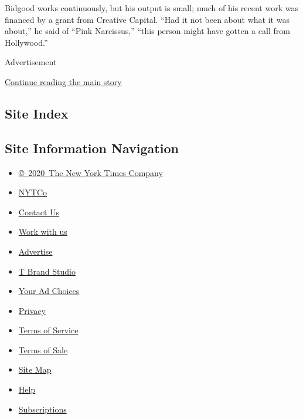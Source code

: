 Bidgood works continuously, but his output is small; much of his recent
work was financed by a grant from Creative Capital. ``Had it not been
about what it was about,'' he said of ``Pink Narcissus,'' ``this person
might have gotten a call from Hollywood.''

Advertisement

\protect\hyperlink{after-bottom}{Continue reading the main story}

\hypertarget{site-index}{%
\subsection{Site Index}\label{site-index}}

\hypertarget{site-information-navigation}{%
\subsection{Site Information
Navigation}\label{site-information-navigation}}

\begin{itemize}
\tightlist
\item
  \href{https://help.nytimes3xbfgragh.onion/hc/en-us/articles/115014792127-Copyright-notice}{©~2020~The
  New York Times Company}
\end{itemize}

\begin{itemize}
\tightlist
\item
  \href{https://www.nytco.com/}{NYTCo}
\item
  \href{https://help.nytimes3xbfgragh.onion/hc/en-us/articles/115015385887-Contact-Us}{Contact
  Us}
\item
  \href{https://www.nytco.com/careers/}{Work with us}
\item
  \href{https://nytmediakit.com/}{Advertise}
\item
  \href{http://www.tbrandstudio.com/}{T Brand Studio}
\item
  \href{https://www.nytimes3xbfgragh.onion/privacy/cookie-policy\#how-do-i-manage-trackers}{Your
  Ad Choices}
\item
  \href{https://www.nytimes3xbfgragh.onion/privacy}{Privacy}
\item
  \href{https://help.nytimes3xbfgragh.onion/hc/en-us/articles/115014893428-Terms-of-service}{Terms
  of Service}
\item
  \href{https://help.nytimes3xbfgragh.onion/hc/en-us/articles/115014893968-Terms-of-sale}{Terms
  of Sale}
\item
  \href{https://spiderbites.nytimes3xbfgragh.onion}{Site Map}
\item
  \href{https://help.nytimes3xbfgragh.onion/hc/en-us}{Help}
\item
  \href{https://www.nytimes3xbfgragh.onion/subscription?campaignId=37WXW}{Subscriptions}
\end{itemize}
